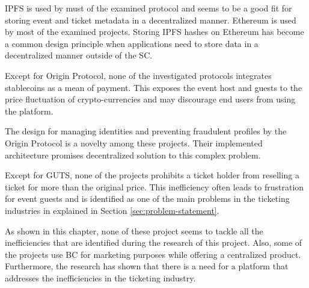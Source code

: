 IPFS is used by must of the examined protocol and seems to be a good fit for storing event and ticket metadata in a decentralized manner. Ethereum is used by most of the examined projects. Storing IPFS hashes on Ethereum has become a common design principle when applications need to store data in a decentralized manner outside of the SC.

Except for Origin Protocol, none of the investigated protocols integrates stablecoins as a mean of payment. This exposes the event host and guests to the price fluctuation of crypto-currencies and may discourage end users from using the platform. 

The design for managing identities and preventing fraudulent profiles by the Origin Protocol is a novelty among these projects. Their implemented architecture promises decentralized solution to this complex problem. 

Except for GUTS, none of the projects prohibits a ticket holder from reselling a ticket for more than the original price. This inefficiency often leads to frustration for event guests and is identified as one of the main problems in the ticketing industries in explained in Section \ref{sec:problem-statement}.

As shown in this chapter, none of these project seems to tackle all the inefficiencies that are identified during the research of this project. Also, some of the projects use BC for marketing purposes while offering a centralized product. Furthermore, the research has shown that there is a need for a platform that addresses the inefficiencies in the ticketing industry. 


